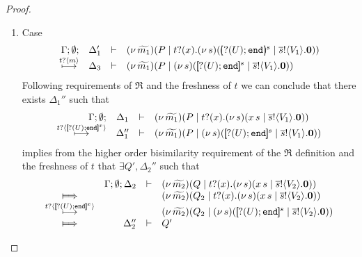 \begin{proof}
\begin{enumerate}
\begin{enumerate}
							and $C_1 = C_2 = \inact$ otherwise.
							From \eqref{proof:trig_equiv00} we can conclude that $\exists \Delta_4$ such that
						\[
							\mhorel{\Gamma}{\Delta_2'}{\newsp{\widetilde{m_1}}{Q \Par \fotrigger{t}{x}{s}{\btinp{U} \tinact}{V_2}}}
							{\Hby{\ell_2}}
							{\Delta_4}{}{\newsp{\widetilde{m_2}'}{Q' \Par \fotrigger{t}{x}{s}{\btinp{U} \tinact}{V_2}}}
						\]
							Equation \eqref{proof:trig_equiv11} then concludes that
						\[
							\mhorel{\Gamma}{\Delta_3'}{\newsp{\widetilde{m_1}'''}{P' \Par \fotrigger{t}{x}{s}{\btinp{U} \tinact}{V_1} \Par C_1}}
							{\Re}
							{\Delta_4'}{}{\newsp{\widetilde{m_2}'''}{Q' \Par \fotrigger{t}{x}{s}{\btinp{U} \tinact}{V_2} \Par C_2}}
						\]
							as required.

					\item	Case
						\[
							\mhorel{\Gamma}{\Delta_1'}{\newsp{\widetilde{m_1}}{P \Par \fotrigger{t}{x}{s}{\btinp{U} \tinact}{V_1}}}
							{\hby{\bactinp{t}{m}}}
							{\Delta_3}{}{\newsp{\widetilde{m_1}}{P \Par \newsp{s}{\map{\btinp{U} \tinact}^{s} \Par \bout{\dual{s}}{V_1} \inact}}}
						\]
							Following requirements of $\Re$ and the freshness of $t$
							we can conclude that there exists $\Delta_1''$ such that
						\[
							\mhorel{\Gamma}{\Delta_1}{\newsp{\widetilde{m_1}}{P \Par \hotrigger{t}{x}{s}{V_1}}}
							{\hby{\bactinp{t}{\map{\btinp{U} \tinact}^{x}}}}
							{\Delta_1''}{}{\newsp{\widetilde{m_1}}{P \Par \newsp{s}{\map{\btinp{U} \tinact}^{s} \Par \bout{\dual{s}}{V_1} \inact}}}
						\]
							implies from the higher order bisimilarity requirement of the $\Re$ definition and
							the freshness of $t$ that $\exists Q', \Delta_2''$ such that
							\begin{eqnarray}
								\begin{array}{crll}
									& \Gamma; \es; \Delta_2 & \proves &		
									\newsp{\widetilde{m_2}}{Q \Par \hotrigger{t}{x}{s}{V_2}}
									\\
									\Hby{} &&&
									\newsp{\widetilde{m_2}}{Q_2 \Par \hotrigger{t}{x}{s}{V_2}}
									\\
									{\hby{\bactinp{t}{\map{\btinp{U} \tinact}^{x}}}} & & &
									\newsp{\widetilde{m_2}}{Q_2 \Par \newsp{s}{\map{\btinp{U} \tinact}^{s} \Par \bout{\dual{s}}{V_2} \inact}}
									\\
									\Hby{} & \Delta_2'' & \proves & Q'
								\end{array}

\end{eqnarray}
\end{enumerate}
\end{enumerate}
\end{proof}
